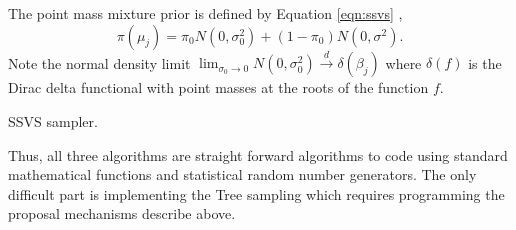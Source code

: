 The point mass mixture prior is defined by Equation \ref{eqn:ssvs} \cite{george1993variable},
\begin{equation}\label{eqn:ssvs_appendix}
\pi(\mu_j) = \pi_0N(0, \sigma_0^2) +(1-\pi_0)N(0, \sigma^2).
\end{equation}
Note the normal density limit $\lim_{\sigma_0 \to 0} N(0, \sigma_0^2) \overset{d}{\to} \delta(\beta_j)$ where $\delta(f)$ is the Dirac delta functional with point masses at the roots of the function $f$. 
					
			\begin{algorithm}[H]
{}
\caption{SSVS sampler.}\label{psd:SSVS_sampler}
			\end{algorithm}

Thus, all three algorithms are straight forward algorithms to code using standard mathematical functions and statistical random number generators. The only difficult part is implementing the Tree sampling which requires programming the proposal mechanisms describe above.